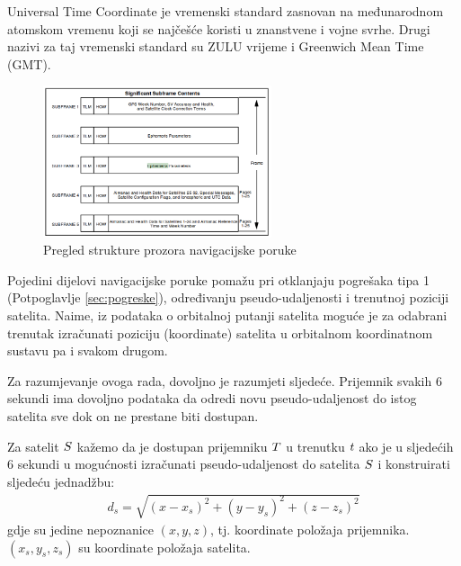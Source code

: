 \documentclass[a4paper,twoside,12pt]{memoir} %
\begin{document}
	\begin{defn}
		Universal Time Coordinate je vremenski standard zasnovan na međunarodnom atomskom vremenu koji se najčešće koristi u znanstvene i vojne svrhe. Drugi nazivi za taj vremenski standard su ZULU vrijeme i Greenwich Mean Time (GMT).
	\end{defn}
	
	\begin{figure}[H]
		\centering
		\includegraphics[width=0.6\textwidth]{NACONTENT}
		\caption{Pregled strukture prozora navigacijske poruke\cite{GPS:1}}
		\label{Fig:aaa}
	\end{figure}
	Pojedini dijelovi navigacijske poruke pomažu pri otklanjaju pogrešaka tipa 1  
	(Potpoglavlje \ref{sec:pogreske}), određivanju
	pseudo-udaljenosti i trenutnoj poziciji satelita.
	Naime, iz podataka o orbitalnoj putanji satelita moguće je za odabrani trenutak izračunati poziciju (koordinate) satelita u orbitalnom koordinatnom sustavu pa i svakom drugom.
	 
	Za razumjevanje ovoga rada, dovoljno je razumjeti sljedeće.
	Prijemnik svakih 6 sekundi ima dovoljno podataka da odredi novu pseudo-udaljenost do istog satelita sve dok on ne prestane biti dostupan. 
	
	\begin{defn}
		\label{stranica:dostupnost}
		Za satelit $\mathnormal{S}$ kažemo da je dostupan prijemniku $\mathnormal{T}$ u trenutku $\mathnormal{t}$ ako je u sljedećih 6 sekundi u mogućnosti izračunati
		pseudo-udaljenost do satelita $\mathnormal{S}$ i konstruirati sljedeću jednadžbu:
		\begin{align}\label{eq:position1}
		d_s = \sqrt{(x-x_s)^{2}+(y-y_s)^{2}+(z-z_s)^{2}}
		\end{align}
		gdje su jedine nepoznanice $(x,y,z)$, tj. koordinate položaja prijemnika.
		$(x_s,y_s,z_s)$ su koordinate položaja satelita. 
	\end{defn}
	
\end{document}
